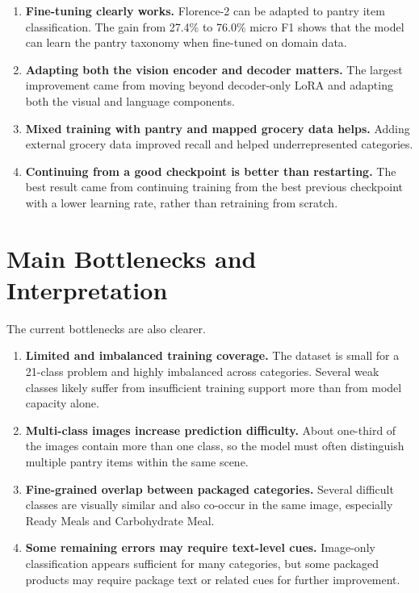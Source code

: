 \documentclass[11pt]{article}
\begin{document}
\begin{enumerate}[nosep,leftmargin=1.5em]
 \item \textbf{Fine-tuning clearly works.} 
 Florence-2 can be adapted to pantry item classification. The gain from 27.4\% to 76.0\% micro F1 shows that the model can learn the pantry taxonomy when fine-tuned on domain data.

 \item \textbf{Adapting both the vision encoder and decoder matters.} 
 The largest improvement came from moving beyond decoder-only LoRA and adapting both the visual and language components.

 \item \textbf{Mixed training with pantry and mapped grocery data helps.} 
 Adding external grocery data improved recall and helped underrepresented categories.

 \item \textbf{Continuing from a good checkpoint is better than restarting.} 
 The best result came from continuing training from the best previous checkpoint with a lower learning rate, rather than retraining from scratch.
\end{enumerate}

\section{Main Bottlenecks and Interpretation}

The current bottlenecks are also clearer.

\begin{enumerate}[nosep,leftmargin=1.5em]
 \item \textbf{Limited and imbalanced training coverage.} 
 The dataset is small for a 21-class problem and highly imbalanced across categories. Several weak classes likely suffer from insufficient training support more than from model capacity alone.

 \item \textbf{Multi-class images increase prediction difficulty.} 
 About one-third of the images contain more than one class, so the model must often distinguish multiple pantry items within the same scene.

 \item \textbf{Fine-grained overlap between packaged categories.} 
 Several difficult classes are visually similar and also co-occur in the same image, especially Ready Meals and Carbohydrate Meal.

 \item \textbf{Some remaining errors may require text-level cues.} 
 Image-only classification appears sufficient for many categories, but some packaged products may require package text or related cues for further improvement.
\end{enumerate}
\end{document}
